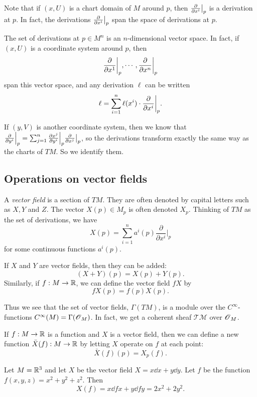 \documentclass[11pt, english]{article}
\begin{document}
Note that if $(x,U)$ is a chart domain of $M$ around $p$, then $\restr{\dd{}{x^i}}{p}$ is a derivation at $p$. In fact, the derivations $\restr{\dd{}{x^i}}{p}$ span the space of derivations at $p$. 

\begin{thm}
The set of derivations at $p \in M^n$ is an $n$-dimensional vector space. In fact, if $(x,U)$ is a coordinate system around $p$, then
\[
\restr{\dd{}{x^1}}{p}, \cdots, \restr{\dd{}{x^n}}{p}
\]
span this vector space, and any derivation $\ell$ can be written 
\[
\ell = \sum_{i=1}^n \ell(x^i) \cdot \restr{\dd{}{x^i}}{p}.
\]
\end{thm}

If $(y,V)$ is another coordinate system, then we know that $\restr{\dd{}{y^i}}{p} = \sum_{j=1}^n \restr{\dd{x^j}{y^i}}{p} \restr{\dd{}{x^j}}{p}$, so the derivations transform exactly the same way as the charts of $TM$. So we identify them.


\subsection{Operations on vector fields}


A \emph{vector field} is a section of $TM$. They are often denoted by capital letters such as $X,Y$ and $Z$. The vector $X(p) \in M_p$ is often denoted $X_p$. Thinking of $TM$ as the set of derivations, we have
\[
X(p) = \sum_{i=1}^n a^i(p) \frac{\partial}{\partial x^i} \Big|_p
\]
for some continuous functions $a^i(p)$.

If $X$ and $Y$ are vector fields, then they can be added:
\[
(X+Y)(p) = X(p) + Y(p).
\]
Similarly, if $f: M \to \mathbb{R}$, we can define the vector field $fX$ by
\[
fX(p) = f(p) X(p).
\]

Thus we see that the set of vector fields, $\Gamma(TM)$, is a module over the $C^\infty$-functions $C^\infty(M)=\Gamma(\operatorname{\mathscr{O}}_
M)$. In fact, we get a coherent sheaf $\mathcal{TM}$ over $\operatorname{\mathscr{O}}_M$.

If $f: M \to \mathbb{R}$ is a function and $X$ is a vector field, then we can define a new function $\bar{X}(f):M \to \mathbb{R}$ by letting $X$ operate on $f$ at each point:
\[
\bar{X}(f)(p) = X_p(f).
\]

\begin{example}
  Let $M=\mathbb{R}^3$ and let $X$ be the vector field $X= x \dd{}{x} + y \dd{}{y}$. Let $f$ be the function $f(x,y,z)=x^2+y^2+z^2$. Then
\[
X(f) = x \dd{f}{x} + y \dd{f}{y} = 2x^2+2y^2.
\]
\end{example}
\end{document}
